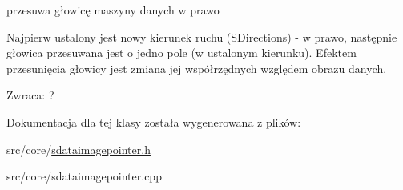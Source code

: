 przesuwa głowicę maszyny danych w prawo 

Najpierw ustalony jest nowy kierunek ruchu (SDirections) - w prawo, następnie głowica przesuwana jest o jedno pole (w ustalonym kierunku). Efektem przesunięcia głowicy jest zmiana jej współrzędnych względem obrazu danych. \begin{Desc}
\item[Zwraca:]? \end{Desc}


Dokumentacja dla tej klasy została wygenerowana z plików:\begin{CompactItemize}
\item 
src/core/\hyperlink{sdataimagepointer_8h}{sdataimagepointer.h}\item 
src/core/sdataimagepointer.cpp\end{CompactItemize}
